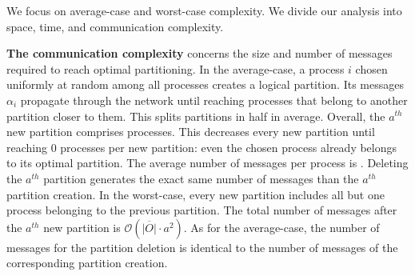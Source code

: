 We focus on average-case and worst-case complexity. We divide our
analysis into space, time, and communication complexity.

\textbf{The communication complexity} concerns the size and number of
messages required to reach optimal partitioning. In the average-case,
a process $i$ chosen uniformly at random among all processes creates a
logical partition. Its messages $\alpha_i$ propagate through the
network until reaching processes that belong to another partition
closer to them. This splits partitions in half in average. Overall,
the $a^{th}$ new partition comprises
processes. This decreases every new partition until reaching $0$
processes per new partition: even the chosen process already belongs
to its optimal partition. The average number of messages per process
is .  Deleting the
$a^{th}$ partition generates the exact same number of messages than
the $a^{th}$ partition creation.  In the
worst-case, every new partition includes all but one process belonging
to the previous partition. The total number of messages after the
$a^{th}$ new partition is $\mathcal{O}(\overline{|O|}\cdot a^2)$. As
for the average-case, the number of messages for the partition
deletion is identical to the number of messages of the corresponding
partition creation.

